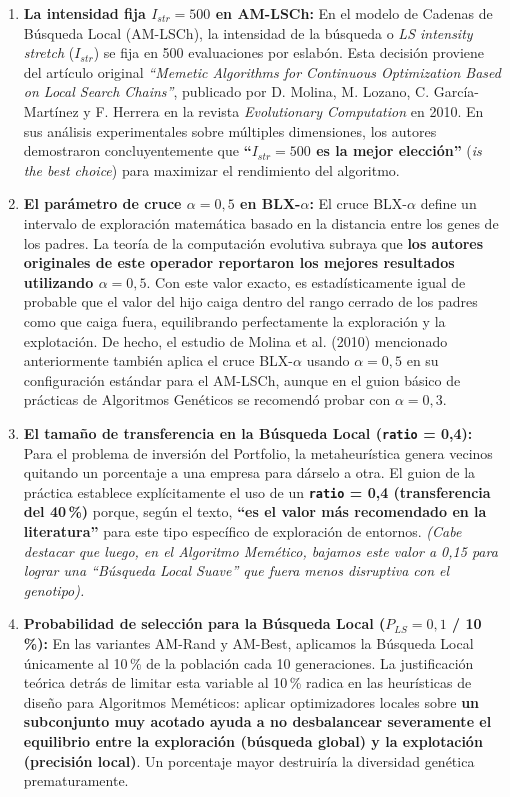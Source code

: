 \begin{enumerate}
    \item \textbf{La intensidad fija $I_{str} = 500$ en AM-LSCh:}
    En el modelo de Cadenas de Búsqueda Local (AM-LSCh), la intensidad de la búsqueda o \textit{LS intensity stretch} ($I_{str}$) se fija en 500 evaluaciones por eslabón. Esta decisión proviene del artículo original \textit{``Memetic Algorithms for Continuous Optimization Based on Local Search Chains''}, publicado por D. Molina, M. Lozano, C. García-Martínez y F. Herrera en la revista \textit{Evolutionary Computation} en 2010. En sus análisis experimentales sobre múltiples dimensiones, los autores demostraron concluyentemente que \textbf{``$I_{str} = 500$ es la mejor elección''} (\textit{is the best choice}) para maximizar el rendimiento del algoritmo.

    \item \textbf{El parámetro de cruce $\alpha = 0{,}5$ en BLX-$\alpha$:}
    El cruce BLX-$\alpha$ define un intervalo de exploración matemática basado en la distancia entre los genes de los padres. La teoría de la computación evolutiva subraya que \textbf{los autores originales de este operador reportaron los mejores resultados utilizando $\alpha = 0{,}5$}. Con este valor exacto, es estadísticamente igual de probable que el valor del hijo caiga dentro del rango cerrado de los padres como que caiga fuera, equilibrando perfectamente la exploración y la explotación. De hecho, el estudio de Molina et al. (2010) mencionado anteriormente también aplica el cruce BLX-$\alpha$ usando $\alpha = 0{,}5$ en su configuración estándar para el AM-LSCh, aunque en el guion básico de prácticas de Algoritmos Genéticos se recomendó probar con $\alpha = 0{,}3$.

    \item \textbf{El tamaño de transferencia en la Búsqueda Local (\texttt{ratio} = 0{,}4):}
    Para el problema de inversión del Portfolio, la metaheurística genera vecinos quitando un porcentaje a una empresa para dárselo a otra. El guion de la práctica establece explícitamente el uso de un \textbf{\texttt{ratio} = 0{,}4 (transferencia del 40\,\%)} porque, según el texto, \textbf{``es el valor más recomendado en la literatura''} para este tipo específico de exploración de entornos. \textit{(Cabe destacar que luego, en el Algoritmo Memético, bajamos este valor a 0{,}15 para lograr una ``Búsqueda Local Suave'' que fuera menos disruptiva con el genotipo).}

    \item \textbf{Probabilidad de selección para la Búsqueda Local ($P_{LS} = 0{,}1$ / 10\,\%):}
    En las variantes AM-Rand y AM-Best, aplicamos la Búsqueda Local únicamente al 10\,\% de la población cada 10 generaciones. La justificación teórica detrás de limitar esta variable al 10\,\% radica en las heurísticas de diseño para Algoritmos Meméticos: aplicar optimizadores locales sobre \textbf{un subconjunto muy acotado ayuda a no desbalancear severamente el equilibrio entre la exploración (búsqueda global) y la explotación (precisión local)}. Un porcentaje mayor destruiría la diversidad genética prematuramente.
\end{enumerate}
